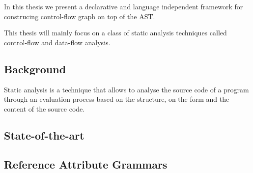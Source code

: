 In this thesis we present a declarative and language independent framework for 
construcing control-flow graph on top of the AST.


This thesis will mainly focus on a class of static analysis techniques called
 control-flow and data-flow analysis. 


\subsection{Background}
Static analysis is a technique that allows to analyse the source code of a program
through an evaluation process based on the structure, on the form and the content
of the source code. 





\subsection{State-of-the-art}


\subsection{Reference Attribute Grammars}



